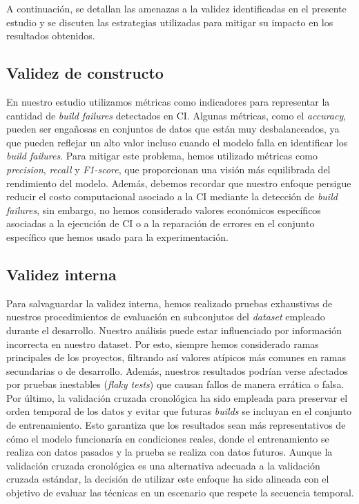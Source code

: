 A continuación, se detallan las amenazas a la validez identificadas en el presente estudio y se
discuten las estrategias utilizadas para mitigar su impacto en los resultados obtenidos.

\subsection{Validez de constructo}
En nuestro estudio utilizamos métricas como indicadores para representar la cantidad de
\textit{build failures} detectados en CI. Algunas métricas, como el \textit{accuracy}, pueden ser
engañosas en conjuntos de datos que están muy desbalanceados, ya que pueden reflejar un alto
valor incluso cuando el modelo falla en identificar los \textit{build failures}. Para mitigar
este problema, hemos utilizado métricas como \textit{precision}, \textit{recall} y \textit{F1-score},
que proporcionan una visión más equilibrada del rendimiento del modelo. Además, debemos
recordar que nuestro enfoque persigue reducir el costo computacional asociado a la CI mediante
la detección de \textit{build failures}, sin embargo, no hemos considerado valores 
económicos específicos asociadas a la ejecución de CI o a la reparación de errores en el conjunto
específico que hemos usado para la experimentación.


\subsection{Validez interna}
Para salvaguardar la validez interna, hemos realizado pruebas exhaustivas de nuestros
procedimientos de evaluación en subconjutos del \textit{dataset} empleado durante el desarrollo.
Nuestro análisis puede estar influenciado por información incorrecta en nuestro dataset. Por
esto, siempre hemos considerado ramas principales de los proyectos, filtrando así
valores atípicos más comunes en ramas secundarias o de desarrollo. Además, nuestros resultados
podrían verse afectados por pruebas inestables (\textit{flaky tests}) que causan fallos
de manera errática o falsa.\\

Por último, la validación cruzada cronológica ha sido empleada para preservar el orden temporal
de los datos y evitar que futuras \textit{builds} se incluyan en el conjunto de entrenamiento. Esto
garantiza que los resultados sean más representativos de cómo el modelo funcionaría en
condiciones reales, donde el entrenamiento se realiza con datos pasados y la prueba se realiza
con datos futuros. Aunque la validación cruzada cronológica es una alternativa adecuada a la
validación cruzada estándar, la decisión de utilizar este enfoque ha sido alineada con el objetivo
de evaluar las técnicas en un escenario que respete la secuencia temporal.



